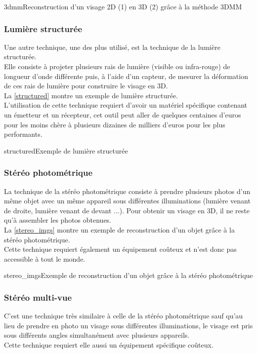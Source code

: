 \documentclass[overfullbox, poster]{polytech/polytech}
\begin{document}
\begin{Figure}{3dmm}{Reconstruction d'un visage 2D (1) en 3D (2) grâce à la méthode 3DMM}
\end{Figure}

\subsubsection{Lumière structurée}
\label{struc_light}
Une autre technique, une des plus utilisé, est la technique de la lumière structurée.\\
Elle consiste à projeter plusieurs rais de lumière (visible ou infra-rouge) de longueur d'onde différente puis, à l'aide d'un capteur, de mesurer la déformation de ces rais de lumière pour construire le visage en 3D.\\
La \autoref{structured} montre un exemple de lumière structurée.\\
L'utilisation de cette technique requiert d'avoir un matériel spécifique contenant un émetteur et un récepteur, cet outil peut aller de quelques centaines d'euros pour les moins chère à plusieurs dizaines de milliers d'euros pour les plus performants.

\begin{Figure}{structured}{Exemple de lumière structurée}
\end{Figure}

\subsubsection{Stéréo photométrique}
\label{photo_stereo}
La technique de la stéréo photométrique consiste à prendre plusieurs photos d'un même objet avec un même appareil sous différentes illuminations (lumière venant de droite, lumière venant de devant ...). Pour obtenir un visage en 3D, il ne reste qu'à assembler les photos obtenues.\\
La \autoref{stereo_imgs} montre un exemple de reconstruction d'un objet grâce à la stéréo photométrique.\\
Cette technique requiert également un équipement coûteux et n'est donc pas accessible à tout le monde.

\begin{Figure}{stereo_imgs}{Exemple de reconstruction d'un objet grâce à la stéréo photométrique}
\end{Figure}


\subsubsection{Stéréo multi-vue}
\label{multi_stereo}
C'est une technique très similaire à celle de la stéréo photométrique sauf qu'au lieu de prendre en photo un visage sous différentes illuminations, le visage est pris sous différents angles simultanément avec plusieurs appareils.\\
Cette technique requiert elle aussi un équipement spécifique coûteux.\\
\\
\\
\end{document}
